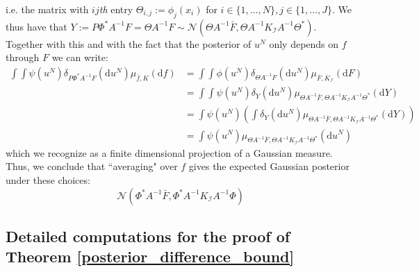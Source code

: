 i.e. the matrix with $ij$\textit{th} entry $\Theta_{i,j}:=\phi_{j}(x_{i})$ for $i\in\{1,\dots,N\},j\in\{1,\dots,J\}$. We thus have that $Y:=P\Phi^{*}A^{-1}F=\Theta A^{-1}F\sim\mathcal{N}(\Theta A^{-1}\bar{F},\Theta A^{-1}K_{\mathcal{I}}A^{-1}\Theta^{*})$. Together with this and with the fact that the posterior of $u^{N}$ only depends on $f$ through $F$ we can write:
\begin{align*}
    \int\int\psi(u^N)\delta_{P\Phi^{*}A^{-1}F}(\mathrm{d}u^N)\mu_{\bar{f},K}(\mathrm{d}f)&=\int\int\phi(u^N)\delta_{\Theta A^{-1}F}(\mathrm{d}u^{N})\mu_{\bar{F},K_{\mathcal{I}}}(\mathrm{d}F) \\
    &=\int\int\psi(u^N)\delta_{Y}(\mathrm{d}u^N)\mu_{\Theta A^{-1}\bar{F},\Theta A^{-1}K_{\mathcal{I}}A^{-1}\Theta^{*}}(\mathrm{d}Y) \\
    &=\int\psi(u^N)\left(\int\delta_{Y}(\mathrm{d}u^N)\mu_{\Theta A^{-1}\bar{F},\Theta A^{-1}K_{\mathcal{I}}A^{-1}\Theta^{*}}(\mathrm{d}Y)\right) \\
    &=\int\psi(u^N)\mu_{\Theta A^{-1}\bar{F},\Theta A^{-1}K_{\mathcal{I}}A^{-1}\Theta^{*}}(\mathrm{d}u^N)
\end{align*}
which we recognize as a finite dimensional projection of a Gaussian measure. Thus, we conclude that ``averaging" over $f$ gives the expected Gaussian posterior under these choices:
\begin{equation}
    \label{average_posterior_FEM_prior}
    \mathcal{N}(\Phi^{*}A^{-1}\bar{F},\Phi^{*}A^{-1}K_{\mathcal{I}}A^{-1}\Phi)
\end{equation}
\qedsymbol

\subsection{Detailed computations for the proof of Theorem \textcolor{blue}{\ref{posterior_difference_bound}}}

